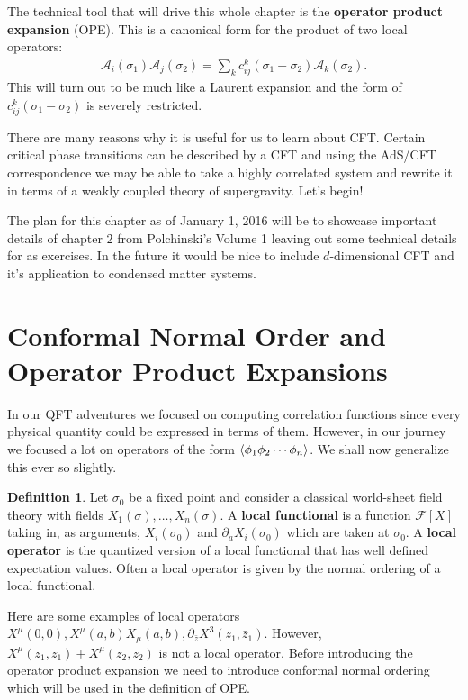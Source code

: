 \documentclass{report}
\theoremstyle{plain}
\theoremstyle{definition}
\newtheorem{definition}[theorem]{Definition}
\theoremstyle{remark}
\newcommand{\mc}{\mathcal}
\newcommand{\ms}{\mathscr}
\newcommand{\sg}{\sigma}
\newcommand{\di}{\partial}
\begin{document}
The technical tool that will drive this whole chapter is the
\textbf{operator product expansion} (OPE). This is a canonical form
for the product of two local operators:
\begin{align}
\mc A_i(\sg_1)\mc A_j(\sg_2) = \sum_k c^k_{ij}(\sg_1-\sg_2) \mc A_k(\sg_2).
\label{OPEdefinition}
\end{align}
This will turn out to be much like a Laurent expansion and the form of
$c^k_{ij}(\sg_1-\sg_2)$ is severely restricted.

There are many reasons why it is useful for us to learn about CFT. Certain
critical phase transitions can be described by a CFT and using the AdS/CFT
correspondence we may be able to take a highly correlated system and
rewrite it in terms of a weakly coupled theory of supergravity. Let's
begin!

The plan for this chapter as of January 1, 2016 will be to showcase important
details of chapter $2$ from Polchinski's Volume 1 leaving out some
technical details for as exercises. In the future it would be nice to
include $d$-dimensional CFT and it's application to condensed matter
systems.

\section{Conformal Normal Order and Operator Product Expansions}

In our QFT adventures we focused on computing correlation functions since
every physical quantity could be expressed in terms of them. However, in
our journey we focused a lot on operators of the form
$\braket{\phi_1\phi_2\cdots\phi_n}$. We shall now generalize this ever so
slightly. 

\begin{definition} Let $\sg_0$ be a fixed point and consider a classical
world-sheet field theory with fields $X_1(\sg),\ldots,X_n(\sg)$. A
\textbf{local functional} is a function
$\ms F[X]$ taking in, as arguments, $X_i(\sg_0)$ and $\di_a
X_i(\sg_0)$ which are taken at $\sg_0$. A \textbf{local operator} is the
quantized version of a local functional that has well defined expectation
values. Often a local operator is given by the normal ordering of a local
functional.
\end{definition}
Here are some examples of local operators $X^\mu(0,0),
X^\mu(a,b)X_\mu(a,b), \di_{\bar z}X^3(z_1,\bar z_1)$. However,
$X^\mu(z_1,\bar z_1)+X^\mu(z_2,\bar z_2)$ is not a local operator.  Before
introducing the operator product expansion we need to introduce conformal
normal ordering which will be used in the definition of OPE.
\end{document}
